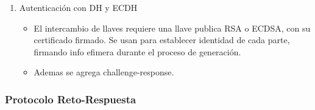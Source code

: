 \documentclass[11pt]{article}
\begin{document}
\begin{enumerate}
\item Autenticación con DH y ECDH
\label{sec:orga6cdb43}
\begin{itemize}
\item El intercambio de llaves requiere una llave publica RSA o ECDSA, con su certificado firmado. Se usan para establecer identidad de cada parte, firmando info efimera durante el proceso de generación.
\item Ademas se agrega challenge-response.
\end{itemize}
\end{enumerate}
\subsubsection{Protocolo Reto-Respuesta}
\label{sec:org6504c36}
\end{document}
